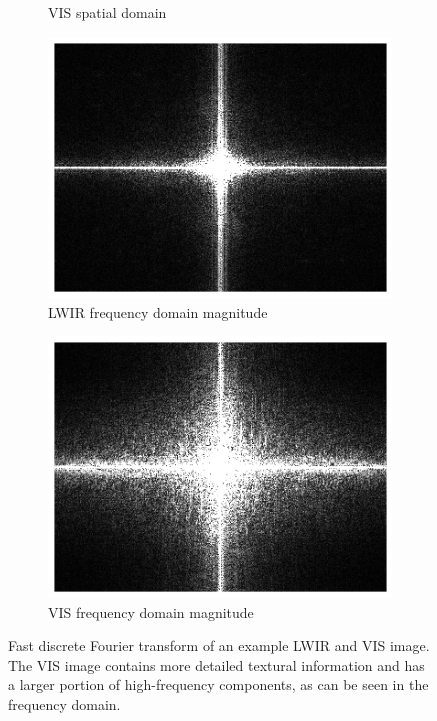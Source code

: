 \documentclass{l4proj}
\begin{document}
\begin{figure}[ht]
\begin{subfigure}[h!]{0.4\textwidth}
    \caption{VIS spatial domain}
    \label{fig:fourier_vis_spatial}
  \end{subfigure}
  \begin{subfigure}[h!]{0.4\textwidth}
    \includegraphics[width=\textwidth]{images/fourier/lwir_freq}
    \caption{LWIR frequency domain magnitude}
    \label{fig:fourier_lwir_freq}
  \end{subfigure}
  \begin{subfigure}[h!]{0.4\textwidth}
      \includegraphics[width=\textwidth]{images/fourier/gray_freq}
      \caption{VIS frequency domain magnitude}
      \label{fig:fourier_vis_freq}
    \end{subfigure}
  \caption{Fast discrete Fourier transform of an example LWIR and VIS image. The VIS image contains more detailed textural information and has a larger portion of high-frequency components, as can be seen in the frequency domain.}
  \label{fig:fourier}
\end{figure}
\end{document}
